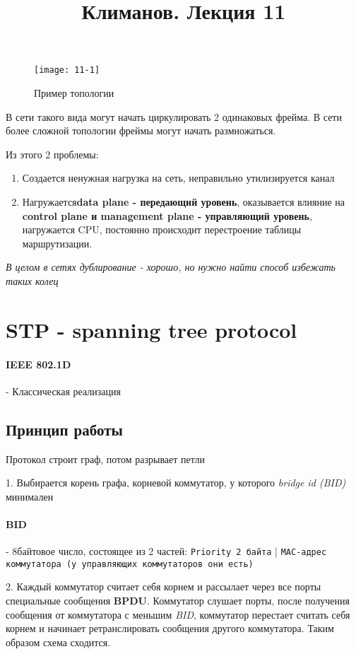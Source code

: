 \documentclass[a4paper,10pt]{article}
\title{Климанов. Лекция 11}
\begin{document}
	\maketitle
	
	\begin{figure}[h!]
		\centering
		\texttt{[image: 11-1]}
		\caption{Пример топологии}
	\end{figure}
	
	В сети такого вида могут начать циркулировать 2 одинаковых фрейма. В сети более сложной топологии фреймы могут начать размножаться.
	
	Из этого 2 проблемы:
	
	\begin{enumerate}
		\item Создается ненужная нагрузка на сеть, неправильно утилизируется канал
		\item Нагружается\textbf{data plane - передающий уровень}, оказывается влияние на \textbf{control plane и management plane - управляющий уровень}, нагружается CPU, постоянно происходит перестроение таблицы маршрутизации.
	\end{enumerate}

	\textit{В целом в сетях дублирование - хорошо, но нужно найти способ избежать таких колец}
	\section{STP - spanning tree protocol} 
	\paragraph{IEEE 802.1D} - Классическая реализация
	\subsection{Принцип работы}
	
	Протокол строит граф, потом разрывает петли
	
	1. Выбирается корень графа, корневой коммутатор, у которого \emph{bridge id (BID)} минимален
	\paragraph{BID} - 8байтовое число, состоящее из 2 частей: \texttt{Priority 2 байта} | \texttt{MAC-адрес коммутатора (у управляющих коммутаторов они есть)}
	 
	2. Каждый коммутатор считает себя корнем и рассылает через все порты специальные сообщения \textbf{BPDU}. Коммутатор слушает порты, после получения сообщения от коммутатора с меньшим \emph{BID}, коммутатор перестает считать себя корнем и начинает ретранслировать сообщения другого коммутатора. Таким образом схема сходится.
	
\end{document}
